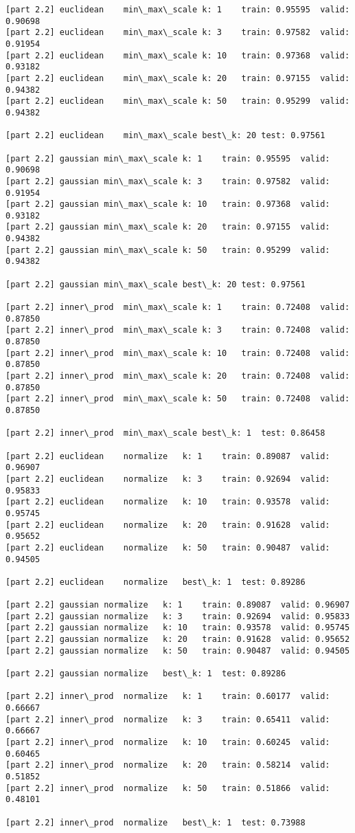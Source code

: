 \documentclass[11pt]{article}
\begin{document}
    \begin{Verbatim}[commandchars=\\\{\}]
[part 2.2] euclidean	min\_max\_scale	k: 1	train: 0.95595	valid: 0.90698
[part 2.2] euclidean	min\_max\_scale	k: 3	train: 0.97582	valid: 0.91954
[part 2.2] euclidean	min\_max\_scale	k: 10	train: 0.97368	valid: 0.93182
[part 2.2] euclidean	min\_max\_scale	k: 20	train: 0.97155	valid: 0.94382
[part 2.2] euclidean	min\_max\_scale	k: 50	train: 0.95299	valid: 0.94382

[part 2.2] euclidean	min\_max\_scale	best\_k: 20	test: 0.97561

[part 2.2] gaussian	min\_max\_scale	k: 1	train: 0.95595	valid: 0.90698
[part 2.2] gaussian	min\_max\_scale	k: 3	train: 0.97582	valid: 0.91954
[part 2.2] gaussian	min\_max\_scale	k: 10	train: 0.97368	valid: 0.93182
[part 2.2] gaussian	min\_max\_scale	k: 20	train: 0.97155	valid: 0.94382
[part 2.2] gaussian	min\_max\_scale	k: 50	train: 0.95299	valid: 0.94382

[part 2.2] gaussian	min\_max\_scale	best\_k: 20	test: 0.97561

[part 2.2] inner\_prod	min\_max\_scale	k: 1	train: 0.72408	valid: 0.87850
[part 2.2] inner\_prod	min\_max\_scale	k: 3	train: 0.72408	valid: 0.87850
[part 2.2] inner\_prod	min\_max\_scale	k: 10	train: 0.72408	valid: 0.87850
[part 2.2] inner\_prod	min\_max\_scale	k: 20	train: 0.72408	valid: 0.87850
[part 2.2] inner\_prod	min\_max\_scale	k: 50	train: 0.72408	valid: 0.87850

[part 2.2] inner\_prod	min\_max\_scale	best\_k: 1	test: 0.86458

[part 2.2] euclidean	normalize	k: 1	train: 0.89087	valid: 0.96907
[part 2.2] euclidean	normalize	k: 3	train: 0.92694	valid: 0.95833
[part 2.2] euclidean	normalize	k: 10	train: 0.93578	valid: 0.95745
[part 2.2] euclidean	normalize	k: 20	train: 0.91628	valid: 0.95652
[part 2.2] euclidean	normalize	k: 50	train: 0.90487	valid: 0.94505

[part 2.2] euclidean	normalize	best\_k: 1	test: 0.89286

[part 2.2] gaussian	normalize	k: 1	train: 0.89087	valid: 0.96907
[part 2.2] gaussian	normalize	k: 3	train: 0.92694	valid: 0.95833
[part 2.2] gaussian	normalize	k: 10	train: 0.93578	valid: 0.95745
[part 2.2] gaussian	normalize	k: 20	train: 0.91628	valid: 0.95652
[part 2.2] gaussian	normalize	k: 50	train: 0.90487	valid: 0.94505

[part 2.2] gaussian	normalize	best\_k: 1	test: 0.89286

[part 2.2] inner\_prod	normalize	k: 1	train: 0.60177	valid: 0.66667
[part 2.2] inner\_prod	normalize	k: 3	train: 0.65411	valid: 0.66667
[part 2.2] inner\_prod	normalize	k: 10	train: 0.60245	valid: 0.60465
[part 2.2] inner\_prod	normalize	k: 20	train: 0.58214	valid: 0.51852
[part 2.2] inner\_prod	normalize	k: 50	train: 0.51866	valid: 0.48101

[part 2.2] inner\_prod	normalize	best\_k: 1	test: 0.73988


    \end{Verbatim}
\end{document}
